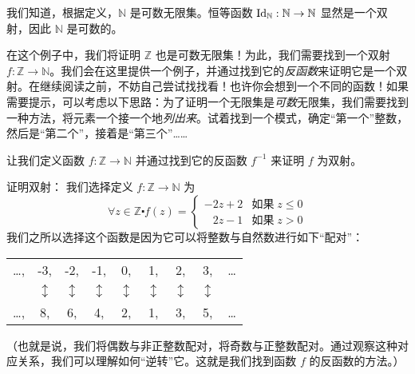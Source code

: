 \begin{example}\label{ex:example7.6.12}

    我们知道，根据定义，$\mathbb{N}$ 是可数无限集。恒等函数 $\text{Id}_{\mathbb{N}} : \mathbb{N} \to \mathbb{N}$ 显然是一个双射，因此 $\mathbb{N}$ 是可数的。

    在这个例子中，我们将证明 $\mathbb{Z}$ 也是可数无限集！为此，我们需要找到一个双射 $f : \mathbb{Z} \to \mathbb{N}$。我们会在这里提供一个例子，并通过找到它的\emph{反函数}来证明它是一个双射。在继续阅读之前，不妨自己尝试找找看！也许你会想到一个不同的函数！如果需要提示，可以考虑以下思路：为了证明一个无限集是\emph{可数}无限集，我们需要找到一种方法，将元素一个接一个地\emph{列出来}。试着找到一个模式，确定``第一个''整数，然后是``第二个''，接着是``第三个''……

    让我们定义函数 $f : \mathbb{Z} \to \mathbb{N}$ 并通过找到它的反函数 $f^{-1}$ 来证明 $f$ 为双射。

    \begin{proofs}{证明双射：}
        我们选择定义 $f : \mathbb{Z} \to \mathbb{N}$ 为
        \[\forall z \in \mathbb{Z} \centerdot f(z) = \begin{cases}
                -2z + 2          & \text{如果}\; z \le 0 \\
                \enspace\; 2z -1 & \text{如果}\; z > 0
            \end{cases}\]
        我们之所以选择这个函数是因为它可以将整数与自然数进行如下``配对''：
        \begin{center}
            \begin{tabular}{ccccccccc}
                \dots , & -3,            & -2,            & -1,            & 0,             & 1,             & 2,             & 3,             & \dots \\
                        & $\updownarrow$ & $\updownarrow$ & $\updownarrow$ & $\updownarrow$ & $\updownarrow$ & $\updownarrow$ & $\updownarrow$ &       \\
                \dots , & 8,             & 6,             & 4,             & 2,             & 1,             & 3,             & 5,             & \dots
            \end{tabular}
        \end{center}
        （也就是说，我们将偶数与非正整数配对，将奇数与正整数配对。通过观察这种对应关系，我们可以理解如何``逆转''它。这就是我们找到函数 $f$ 的反函数的方法。）


\end{proofs}
\end{example}
